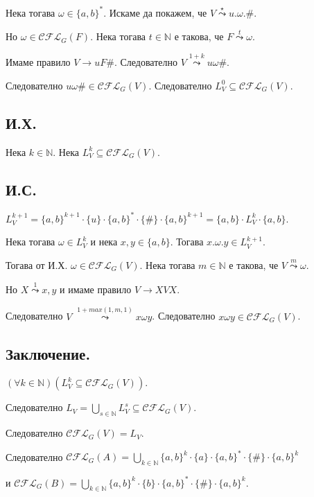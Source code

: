 \documentclass[12pt]{article}
\begin{document}
Нека тогава \(\omega \in \{a, b\}^*\). Искаме да покажем, че \(V \overset{\star}{\leadsto} u.\omega.\#\).

Но \(\omega \in \mathcal{CFL}_G(F)\). Нека тогава \(t \in \mathbb{N}\) е такова, че \(F \overset{t}{\leadsto} \omega\).

Имаме правило \(V \to uF\#\). Следователно \(V \overset{1 + k}{\leadsto} u\omega\#\).

Следователно \(u\omega\# \in \mathcal{CFL}_G(V)\). Следователно \(L_V^0 \subseteq \mathcal{CFL}_G(V)\).

\subsection*{И.Х.}
Нека \(k \in \mathbb{N}\). Нека \(L_V^k \subseteq \mathcal{CFL}_G(V)\).

\subsection*{И.С.}
\(L_V^{k + 1} = \{a, b\}^{k + 1} \cdot \{u\} \cdot \{a, b\}^* \cdot \{\#\} \cdot \{a, b\}^{k + 1} = \{a, b\} \cdot L_V^k \cdot \{a, b\}\).

Нека тогава \(\omega \in L_V^k\) и нека \(x, y \in \{a, b\}\). Тогава \(x.\omega.y \in L_V^{k + 1}\).

Тогава от И.Х. \(\omega \in \mathcal{CFL}_G(V)\). Нека тогава \(m  \in \mathbb{N}\) е такова, че \(V \overset{m}{\leadsto} \omega\).

Но \(X \overset{1}{\leadsto} x, y\) и имаме правило \(V \to XVX\).

Следователно \(V \;\overset{1 + max(1, m, 1)}{\leadsto} x\omega y\). Следователно \(x \omega y \in \mathcal{CFL}_G(V)\).

\subsection*{Заключение.}
\((\forall k \in \mathbb{N})(L_V^k \subseteq \mathcal{CFL}_G(V))\).

Следователно \(L_V = \displaystyle\bigcup_{s \in \mathbb{N}} L_V^s \subseteq \mathcal{CFL}_G(V)\).

Следователно \(\mathcal{CFL}_G(V) = L_V\).

Следователно \(\mathcal{CFL}_G(A) = \displaystyle\bigcup_{k \in \mathbb{N}} \{a, b\}^k \cdot \{a\} \cdot \{a, b\}^* \cdot \{\#\} \cdot \{a, b\}^k\)

и \(\mathcal{CFL}_G(B) = \displaystyle\bigcup_{k \in \mathbb{N}} \{a, b\}^k \cdot \{b\} \cdot \{a, b\}^* \cdot \{\#\} \cdot \{a, b\}^k\).
\end{document}
